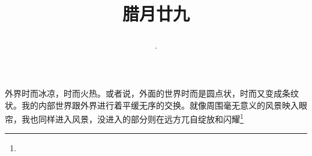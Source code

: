 \title{\date[d=8,m=2,y=2024][year:cn-y,年,month:cn,day:cn,日,·,weekday]·腊月廿九 }
外界时而冰凉，时而火热。或者说，外面的世界时而是圆点状，时而又变成条纹状。我的内部世界跟外界进行着平缓无序的交换。就像周围毫无意义的风景映入眼帘，我也同样进入风景，没进入的部分则在远方兀自绽放和闪耀\footnote{ }

